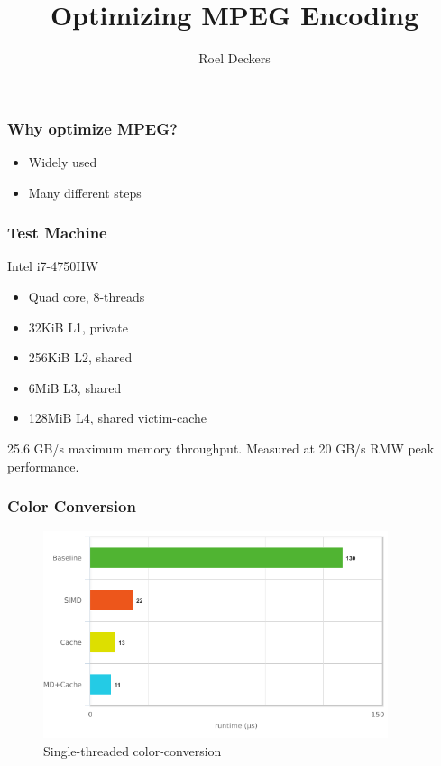 \documentclass{beamer}
\title{Optimizing MPEG Encoding}
\author{Roel Deckers}
\institute{Uppsala University}
\begin{document}

\begin{frame}
\titlepage
\end{frame}

\begin{frame}
  \frametitle{Why optimize MPEG?}
  \begin{itemize}
    \item{Widely used}
    \item{Many different steps}
  \end{itemize}
\end{frame}

\begin{frame}
  \frametitle{Test Machine}
  Intel i7-4750HW\\
  \begin{itemize}
    \item{Quad core, 8-threads}
    \item{32KiB L1, private}
    \item{256KiB L2, shared}
    \item{6MiB L3, shared}
    \item{128MiB L4, shared victim-cache}
  \end{itemize}
  25.6 GB/s maximum memory throughput. Measured at 20 GB/s RMW peak performance.
\end{frame}

\begin{frame}
  \frametitle{Color Conversion}
  \begin{figure}
  \includegraphics[width=0.9\textwidth]{images/sc}
  \caption{Single-threaded color-conversion}
  \end{figure}
\end{frame}
\end{document}
